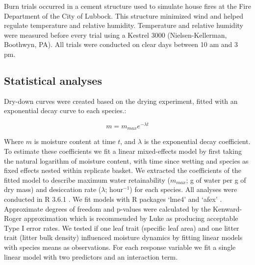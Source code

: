 \documentclass[letterpaper,12pt]{article}
\begin{document}
Burn trials occurred in a cement structure used to simulate house fires at the
Fire Department of the City of Lubbock. This structure minimized wind and
helped regulate temperature and relative humidity. Temperature and relative
humidity were measured before every trial using a Kestrel 3000
(Nielsen-Kellerman, Boothwyn, PA). All trials were conducted on clear days
between 10 am and 3 pm.

\subsection*{Statistical analyses}

Dry-down curves were created based on the drying experiment, fitted with an
exponential decay curve to each species.:

\begin{equation}
m = m_{max} e^{-\lambda t}
\end{equation}

Where $m$ is moisture content at time $t$, and $\lambda$ is the exponential
decay coefficient. To estimate these coefficients we fit a linear mixed-effects
model by first taking the natural logarithm of moisture content, with time
since wetting and species as fixed effects nested within replicate basket. We
extracted the coefficients of the fitted model to describe maximum water
retainability ($m_{max}$; g of water per g of dry mass) and desiccation rate
($\lambda$; hour$^{-1}$) for each species. All analyses were conducted in R 3.6.1
\citep{RCoreTeam-2019}. We fit models with R packages `lme4'
\citep{Bates_Machler_etal-2015} and `afex' \citep{Singmann_Bolker_etal-2017}.
Approximate degrees of freedom and p-values were calculated by the
Kenward-Roger approximation \citep{Kenward_Roger-1997} which is recommended by
Luke \citeyear{Luke-2017} as producing acceptable Type I error rates. We tested if
one leaf trait (specific leaf area) and one litter trait (litter bulk density)
influenced moisture dynamics by fitting linear models with species means as
observations. For each response variable we fit a single linear model with two
predictors and an interaction term.
\end{document}
